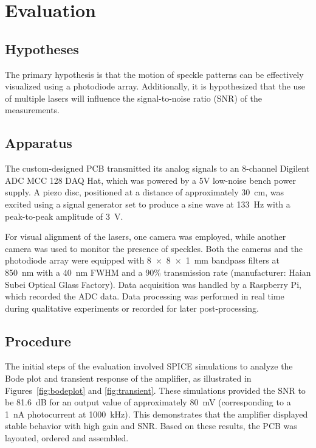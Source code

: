 \section{Evaluation}
\label{sec:evaluation}

\subsection{Hypotheses}
The primary hypothesis is that the motion of speckle patterns can be effectively visualized using a photodiode array. 
Additionally, it is hypothesized that the use of multiple lasers will influence the signal-to-noise ratio (SNR) of the measurements.

\subsection{Apparatus}

The custom-designed PCB transmitted its analog signals to an 8-channel Digilent ADC MCC 128 DAQ Hat, which was powered by a 5V low-noise bench power supply. 
A piezo disc, positioned at a distance of approximately 30~cm, was excited using a signal generator set to produce a sine wave at 133~Hz with a peak-to-peak amplitude of 3~V. 

For visual alignment of the lasers, one camera was employed, while another camera was used to monitor the presence of speckles. 
Both the cameras and the photodiode array were equipped with 8~$\times$~8~$\times$~1~mm bandpass filters at 850~nm with a 40~nm FWHM and a 90\% transmission rate (manufacturer: Haian Subei Optical Glass Factory).
Data acquisition was handled by a Raspberry Pi, which recorded the ADC data. 
Data processing was performed in real time during qualitative experiments or recorded for later post-processing.

\subsection{Procedure}

The initial steps of the evaluation involved SPICE simulations to analyze the Bode plot and transient response of the amplifier, as illustrated in Figures~\ref{fig:bodeplot} and \ref{fig:transient}. 
These simulations provided the SNR to be 81.6~dB for an output value of approximately 80~mV (corresponding to a 1~nA photocurrent at 1000~kHz). 
This demonstrates that the amplifier displayed stable behavior with high gain and SNR. Based on these results, the PCB was layouted, ordered and assembled.

